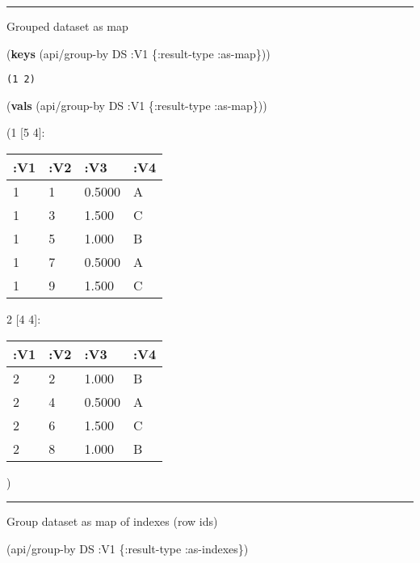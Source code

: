 \documentclass[]{article}
\newenvironment{Shaded}{\begin{snugshade}}{\end{snugshade}}
\newcommand{\KeywordTok}[1]{\textcolor[rgb]{0.13,0.29,0.53}{\textbf{#1}}}
\newcommand{\AttributeTok}[1]{\textcolor[rgb]{0.77,0.63,0.00}{#1}}
\newcommand{\NormalTok}[1]{#1}
\begin{document}
\begin{center}\rule{0.5\linewidth}{0.5pt}\end{center}

Grouped dataset as map

\begin{Shaded}
\begin{Highlighting}[]
\NormalTok{(}\KeywordTok{keys}\NormalTok{ (api/group-by DS }\AttributeTok{:V1}\NormalTok{ \{}\AttributeTok{:result-type} \AttributeTok{:as-map}\NormalTok{\}))}
\end{Highlighting}
\end{Shaded}

\begin{verbatim}
(1 2)
\end{verbatim}

\begin{Shaded}
\begin{Highlighting}[]
\NormalTok{(}\KeywordTok{vals}\NormalTok{ (api/group-by DS }\AttributeTok{:V1}\NormalTok{ \{}\AttributeTok{:result-type} \AttributeTok{:as-map}\NormalTok{\}))}
\end{Highlighting}
\end{Shaded}

(1 {[}5 4{]}:

\begin{longtable}[]{@{}llll@{}}
\toprule
:V1 & :V2 & :V3 & :V4\tabularnewline
\midrule
\endhead
1 & 1 & 0.5000 & A\tabularnewline
1 & 3 & 1.500 & C\tabularnewline
1 & 5 & 1.000 & B\tabularnewline
1 & 7 & 0.5000 & A\tabularnewline
1 & 9 & 1.500 & C\tabularnewline
\bottomrule
\end{longtable}

2 {[}4 4{]}:

\begin{longtable}[]{@{}llll@{}}
\toprule
:V1 & :V2 & :V3 & :V4\tabularnewline
\midrule
\endhead
2 & 2 & 1.000 & B\tabularnewline
2 & 4 & 0.5000 & A\tabularnewline
2 & 6 & 1.500 & C\tabularnewline
2 & 8 & 1.000 & B\tabularnewline
\bottomrule
\end{longtable}

)

\begin{center}\rule{0.5\linewidth}{0.5pt}\end{center}

Group dataset as map of indexes (row ids)

\begin{Shaded}
\begin{Highlighting}[]
\NormalTok{(api/group-by DS }\AttributeTok{:V1}\NormalTok{ \{}\AttributeTok{:result-type} \AttributeTok{:as-indexes}\NormalTok{\})}
\end{Highlighting}
\end{Shaded}
\end{document}
